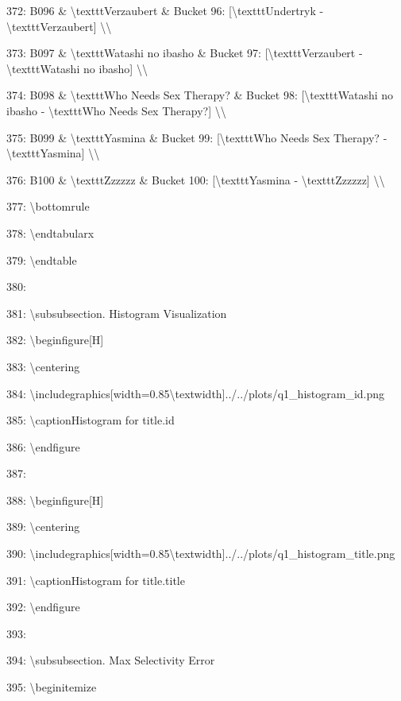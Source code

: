 \documentclass[11pt,a4paper]{article}
\begin{document}
{372: B096 \& \textbackslash{}texttt{Verzaubert} \& Bucket 96: [\textbackslash{}texttt{Undertryk} - \textbackslash{}texttt{Verzaubert}] \textbackslash{}\textbackslash{}

373: B097 \& \textbackslash{}texttt{Watashi no ibasho} \& Bucket 97: [\textbackslash{}texttt{Verzaubert} - \textbackslash{}texttt{Watashi no ibasho}] \textbackslash{}\textbackslash{}

374: B098 \& \textbackslash{}texttt{Who Needs Sex Therapy?} \& Bucket 98: [\textbackslash{}texttt{Watashi no ibasho} - \textbackslash{}texttt{Who Needs Sex Therapy?}] \textbackslash{}\textbackslash{}

375: B099 \& \textbackslash{}texttt{Yasmina} \& Bucket 99: [\textbackslash{}texttt{Who Needs Sex Therapy?} - \textbackslash{}texttt{Yasmina}] \textbackslash{}\textbackslash{}

376: B100 \& \textbackslash{}texttt{Zzzzzz} \& Bucket 100: [\textbackslash{}texttt{Yasmina} - \textbackslash{}texttt{Zzzzzz}] \textbackslash{}\textbackslash{}

377: \textbackslash{}bottomrule

378: \textbackslash{}end{tabularx}

379: \textbackslash{}end{table}

380:

381: \textbackslash{}subsubsection{. Histogram Visualization}

382: \textbackslash{}begin{figure}[H]

383: \textbackslash{}centering

384: \textbackslash{}includegraphics[width=0.85\textbackslash{}textwidth]{../../plots/q1\_histogram\_id.png}

385: \textbackslash{}caption{Histogram for title.id}

386: \textbackslash{}end{figure}

387:

388: \textbackslash{}begin{figure}[H]

389: \textbackslash{}centering

390: \textbackslash{}includegraphics[width=0.85\textbackslash{}textwidth]{../../plots/q1\_histogram\_title.png}

391: \textbackslash{}caption{Histogram for title.title}

392: \textbackslash{}end{figure}

393:

394: \textbackslash{}subsubsection{. Max Selectivity Error}

395: \textbackslash{}begin{itemize}

}
\end{document}
